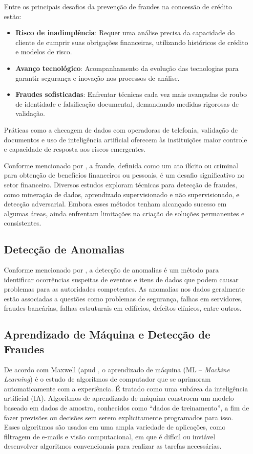 \documentclass[12pt,a4paper]{article}
\begin{document}
Entre os principais desafios da prevenção de fraudes na concessão de crédito estão:
\begin{itemize}
    \item \textbf{Risco de inadimplência}: Requer uma análise precisa da capacidade do cliente de cumprir suas obrigações financeiras, utilizando históricos de crédito e modelos de risco.
    \item \textbf{Avanço tecnológico}: Acompanhamento da evolução das tecnologias para garantir segurança e inovação nos processos de análise.
    \item \textbf{Fraudes sofisticadas}: Enfrentar técnicas cada vez mais avançadas de roubo de identidade e falsificação documental, demandando medidas rigorosas de validação.
\end{itemize}

Práticas como a checagem de dados com operadoras de telefonia, validação de documentos e uso de inteligência artificial oferecem às instituições maior controle e capacidade de resposta aos riscos emergentes.

Conforme mencionado por \cite{maniraj2019}, a fraude, definida como um ato ilícito ou criminal para obtenção de benefícios financeiros ou pessoais, é um desafio significativo no setor financeiro. Diversos estudos exploram técnicas para detecção de fraudes, como mineração de dados, aprendizado supervisionado e não supervisionado, e detecção adversarial. Embora esses métodos tenham alcançado sucesso em algumas áreas, ainda enfrentam limitações na criação de soluções permanentes e consistentes.
\subsection{Detecção de Anomalias}

Conforme mencionado por \cite{gupta2020}, a detecção de anomalias é um método para identificar ocorrências suspeitas de eventos e itens de dados que podem causar problemas para as autoridades competentes. As anomalias nos dados geralmente estão associadas a questões como problemas de segurança, falhas em servidores, fraudes bancárias, falhas estruturais em edifícios, defeitos clínicos, entre outros.

\subsection{Aprendizado de Máquina e Detecção de Fraudes}

De acordo com Maxwell (apud \cite{martins2022}, o aprendizado de máquina (ML – \textit{Machine Learning}) é o estudo de algoritmos de computador que se aprimoram automaticamente com a experiência. É tratado como uma subárea da inteligência artificial (IA). Algoritmos de aprendizado de máquina constroem um modelo baseado em dados de amostra, conhecidos como “dados de treinamento”, a fim de fazer previsões ou decisões sem serem explicitamente programados para isso. Esses algoritmos são usados em uma ampla variedade de aplicações, como filtragem de e-mails e visão computacional, em que é difícil ou inviável desenvolver algoritmos convencionais para realizar as tarefas necessárias.
\end{document}
